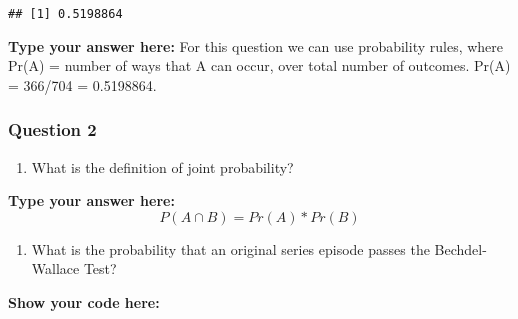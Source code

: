 \documentclass[
]{article}
\newenvironment{Shaded}{\begin{snugshade}}{\end{snugshade}}
\newcommand{\CommentTok}[1]{\textcolor[rgb]{0.56,0.35,0.01}{\textit{#1}}}
\newcommand{\KeywordTok}[1]{\textcolor[rgb]{0.13,0.29,0.53}{\textbf{#1}}}
\newcommand{\NormalTok}[1]{#1}
\newcommand{\OperatorTok}[1]{\textcolor[rgb]{0.81,0.36,0.00}{\textbf{#1}}}
\newcommand{\StringTok}[1]{\textcolor[rgb]{0.31,0.60,0.02}{#1}}
\providecommand{\tightlist}{%
  \setlength{\itemsep}{0pt}\setlength{\parskip}{0pt}}
\begin{document}
\begin{verbatim}
## [1] 0.5198864
\end{verbatim}

\textbf{Type your answer here:} For this question we can use probability
rules, where Pr(A) = number of ways that A can occur, over total number
of outcomes. Pr(A) = 366/704 = 0.5198864.

\hypertarget{question-2-1}{%
\subsubsection{Question 2}\label{question-2-1}}

\begin{enumerate}
\def\labelenumi{\alph{enumi}.}
\tightlist
\item
  What is the definition of joint probability?
\end{enumerate}

\textbf{Type your answer here:} \[
P(A \cap B) = Pr(A) * Pr(B)
\]

\begin{enumerate}
\def\labelenumi{\alph{enumi}.}
\setcounter{enumi}{1}
\tightlist
\item
  What is the probability that an original series episode passes the
  Bechdel-Wallace Test?
\end{enumerate}

\textbf{Show your code here:}

\begin{Shaded}
\end{Shaded}
\end{document}
